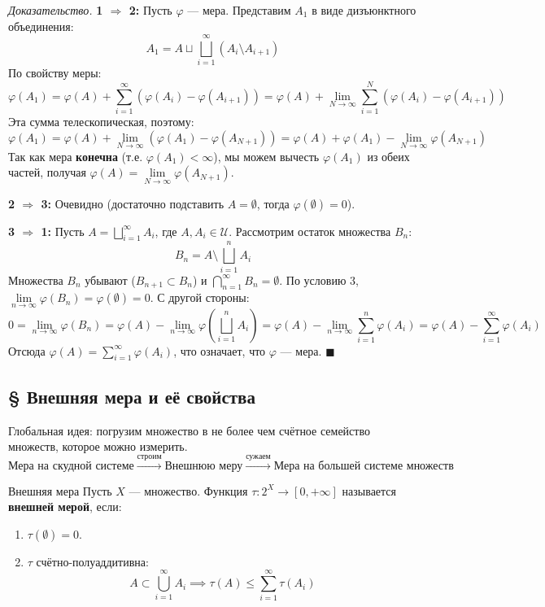 \documentclass[12pt,a4paper]{article}
\newenvironment{Proof}[1][Доказательство]{\vspace{0.5em}\noindent\textit{#1.}\hspace{0.5em}\ignorespaces}{\hfill$\blacksquare$\vspace{1em}}
\begin{document}
\begin{Proof}
\textbf{1 $\Rightarrow$ 2:} Пусть $\varphi$ — мера. Представим $A_1$ в виде дизъюнктного объединения:
$$ A_1 = A \sqcup \bigsqcup\limits_{i=1}^{\infty} (A_i \setminus A_{i+1}) $$
По свойству меры:
$$ \varphi(A_1) = \varphi(A) + \sum\limits_{i=1}^{\infty} (\varphi(A_i) - \varphi(A_{i+1})) = \varphi(A) + \lim\limits_{N \to \infty} \sum\limits_{i=1}^N (\varphi(A_i) - \varphi(A_{i+1})) $$
Эта сумма телескопическая, поэтому:
$$ \varphi(A_1) = \varphi(A) + \lim\limits_{N \to \infty} (\varphi(A_1) - \varphi(A_{N+1})) = \varphi(A) + \varphi(A_1) - \lim\limits_{N \to \infty} \varphi(A_{N+1}) $$
Так как мера \textbf{конечна} (т.е. $\varphi(A_1) < \infty$), мы можем вычесть $\varphi(A_1)$ из обеих частей, получая $\varphi(A) = \lim\limits_{N \to \infty} \varphi(A_{N+1})$.

\textbf{2 $\Rightarrow$ 3:} Очевидно (достаточно подставить $A = \emptyset$, тогда $\varphi(\emptyset) = 0$).

\textbf{3 $\Rightarrow$ 1:} Пусть $A = \bigsqcup\limits_{i=1}^{\infty} A_i$, где $A, A_i \in \mathcal{U}$. Рассмотрим остаток множества $B_n$:
$$ B_n = A \setminus \bigsqcup\limits_{i=1}^n A_i $$
Множества $B_n$ убывают ($B_{n+1} \subset B_n$) и $\bigcap\limits_{n=1}^{\infty} B_n = \emptyset$. По условию 3, $\lim\limits_{n \to \infty} \varphi(B_n) = \varphi(\emptyset) = 0$.
С другой стороны:
$$ 0 = \lim\limits_{n \to \infty} \varphi(B_n) = \varphi(A) - \lim\limits_{n \to \infty} \varphi \left( \bigsqcup\limits_{i=1}^n A_i \right) = \varphi(A) - \lim\limits_{n \to \infty} \sum\limits_{i=1}^n \varphi(A_i) = \varphi(A) - \sum\limits_{i=1}^{\infty} \varphi(A_i) $$
Отсюда $\varphi(A) = \sum\limits_{i=1}^{\infty} \varphi(A_i)$, что означает, что $\varphi$ — мера.
\end{Proof}


\setcounter{section}{4}

\subsection{§ Внешняя мера и её свойства}

Глобальная идея: погрузим множество в не более чем счётное семейство множеств, которое можно измерить. 
$$ \text{Мера на скудной системе} \xrightarrow{\text{строим}} \text{Внешнюю меру} \xrightarrow{\text{сужаем}} \text{Мера на большей системе множеств} $$

\begin{Definition}{Внешняя мера}{}
Пусть $X$ — множество. Функция $\tau: 2^X \to [0, +\infty]$ называется \textbf{внешней мерой}, если:
\begin{enumerate}
    \item $\tau(\emptyset) = 0$.
    \item $\tau$ счётно-полуаддитивна: 
    $$ A \subset \bigcup\limits_{i=1}^{\infty} A_i \implies \tau(A) \le \sum\limits_{i=1}^{\infty} \tau(A_i) $$
\end{enumerate}
\end{Definition}
\end{document}
